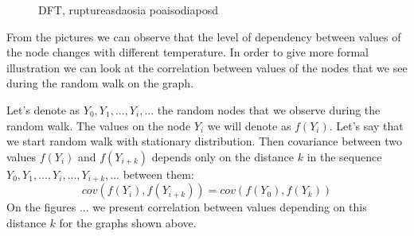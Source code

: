 \documentclass[12pt]{report}
\begin{document}
\begin{figure} 
  \caption{DFT, ruptureasdaosia poaisodiaposd}
\end{figure}


From the pictures we can observe that the level of dependency between values of the node changes with different temperature.
In order to give more formal illustration we can look at the correlation between values of the nodes that we see during the random walk on the graph.

Let's denote as $Y_0, Y_1, ..., Y_i, ...$  the random nodes that we observe during the random walk. The values on the node $Y_i$ we will denote as $f(Y_i)$.  Let's say that we start random walk with stationary distribution. Then covariance between  two values $f(Y_i)$ and $f(Y_{i+k})$ depends only on the distance $k$ in the sequence $Y_0, Y_1, ..., Y_i, ..., Y_{i+k}, ...$ between them:
$$cov(f(Y_i), f(Y_{i+k})) = cov(f(Y_0), f(Y_k))$$
On the figures ... we present correlation between values depending on this distance $k$ for the graphs shown above.
\end{document}
